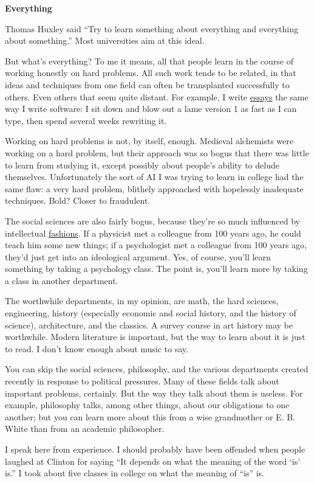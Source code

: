 \documentclass[12pt]{book}
\begin{document}
\textbf{Everything}

Thomas Huxley said ``Try to learn something about everything and
everything about something.'' Most universities aim at this ideal.

But what's everything? To me it means, all that people learn in the
course of working honestly on hard problems. All such work tends to be
related, in that ideas and techniques from one field can often be
transplanted successfully to others. Even others that seem quite
distant. For example, I write \href{essay.html}{essays} the same way I
write software: I sit down and blow out a lame version 1 as fast as I
can type, then spend several weeks rewriting it.

Working on hard problems is not, by itself, enough. Medieval alchemists
were working on a hard problem, but their approach was so bogus that
there was little to learn from studying it, except possibly about
people's ability to delude themselves. Unfortunately the sort of AI I
was trying to learn in college had the same flaw: a very hard problem,
blithely approached with hopelessly inadequate techniques. Bold? Closer
to fraudulent.

The social sciences are also fairly bogus, because they're so much
influenced by intellectual \href{say.html}{fashions}. If a physicist met
a colleague from 100 years ago, he could teach him some new things; if a
psychologist met a colleague from 100 years ago, they'd just get into an
ideological argument. Yes, of course, you'll learn something by taking a
psychology class. The point is, you'll learn more by taking a class in
another department.

The worthwhile departments, in my opinion, are math, the hard sciences,
engineering, history (especially economic and social history, and the
history of science), architecture, and the classics. A survey course in
art history may be worthwhile. Modern literature is important, but the
way to learn about it is just to read. I don't know enough about music
to say.

You can skip the social sciences, philosophy, and the various
departments created recently in response to political pressures. Many of
these fields talk about important problems, certainly. But the way they
talk about them is useless. For example, philosophy talks, among other
things, about our obligations to one another; but you can learn more
about this from a wise grandmother or E. B. White than from an academic
philosopher.

I speak here from experience. I should probably have been offended when
people laughed at Clinton for saying ``It depends on what the meaning of
the word `is' is.'' I took about five classes in college on what the
meaning of ``is'' is.
\end{document}
